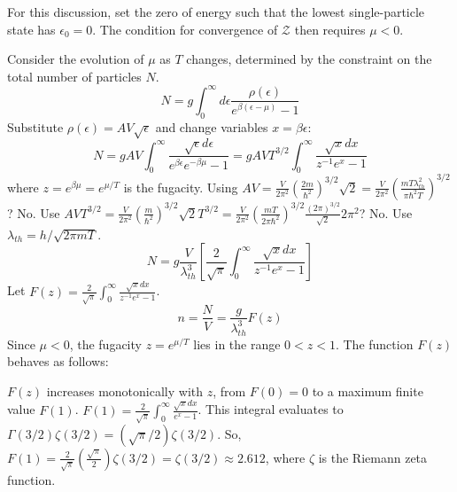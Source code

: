 \documentclass[11pt]{article}
\newcommand{\grandpartfn}{\mathcal{Z}} %
\newcommand{\lambdaT}{\lambda_{th}} %
\newcommand{\eps}{\epsilon}
\begin{document}
For this discussion, set the zero of energy such that the lowest single-particle state has $\eps_0 = 0$. The condition for convergence of $\grandpartfn$ then requires $\mu < 0$.

Consider the evolution of $\mu$ as $T$ changes, determined by the constraint on the total number of particles $N$.
\[ N = g \int_0^\infty d\eps \frac{\rho(\eps)}{e^{\beta(\eps-\mu)} - 1} \]
Substitute $\rho(\eps) = A V \sqrt{\eps}$ and change variables $x=\beta\eps$:
\[ N = g AV \int_0^\infty \frac{\sqrt{\eps} d\eps}{e^{\beta\eps}e^{-\beta\mu} - 1} = g AV T^{3/2} \int_0^\infty \frac{\sqrt{x} dx}{z^{-1}e^x - 1} \]
where $z = e^{\beta\mu} = e^{\mu/T}$ is the fugacity.
Using $AV = \frac{V}{2\pi^2} (\frac{2m}{\hbar^2})^{3/2} \sqrt{2} = \frac{V}{2\pi^2} (\frac{m T \lambdaT^2}{\pi \hbar^2 T})^{3/2}$? No.
Use $A V T^{3/2} = \frac{V}{2\pi^2} (\frac{m}{\hbar^2})^{3/2} \sqrt{2} T^{3/2} = \frac{V}{2\pi^2} (\frac{mT}{2\pi\hbar^2})^{3/2} \frac{(2\pi)^{3/2}}{\sqrt{2}} 2\pi^2$? No.
Use $\lambdaT = h/\sqrt{2\pi m T}$.
\[ N = g \frac{V}{\lambdaT^3} \left[ \frac{2}{\sqrt{\pi}} \int_0^\infty \frac{\sqrt{x} dx}{z^{-1}e^x - 1} \right] \]
Let $F(z) = \frac{2}{\sqrt{\pi}} \int_0^\infty \frac{\sqrt{x} dx}{z^{-1}e^x - 1}$.
\[ n = \frac{N}{V} = \frac{g}{\lambdaT^3} F(z) \]
Since $\mu < 0$, the fugacity $z = e^{\mu/T}$ lies in the range $0 < z < 1$.
The function $F(z)$ behaves as follows:

\begin{center}
\end{center}
$F(z)$ increases monotonically with $z$, from $F(0)=0$ to a maximum finite value $F(1)$.
$F(1) = \frac{2}{\sqrt{\pi}} \int_0^\infty \frac{\sqrt{x} dx}{e^x - 1}$. This integral evaluates to $\Gamma(3/2)\zeta(3/2) = (\sqrt{\pi}/2)\zeta(3/2)$.
So, $F(1) = \frac{2}{\sqrt{\pi}} (\frac{\sqrt{\pi}}{2}) \zeta(3/2) = \zeta(3/2) \approx 2.612$, where $\zeta$ is the Riemann zeta function.
\end{document}
